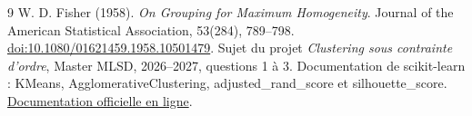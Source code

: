 \documentclass[10pt,a4paper]{article}
\begin{document}
\begingroup\small
\begin{thebibliography}{9}
\setlength{\itemsep}{2pt}
 W. D. Fisher (1958). \emph{On Grouping for Maximum Homogeneity}.
Journal of the American Statistical Association, 53(284), 789--798.
\href{https://doi.org/10.1080/01621459.1958.10501479}{doi:10.1080/01621459.1958.10501479}.
 Sujet du projet \emph{Clustering sous contrainte d'ordre},
Master MLSD, 2026--2027, questions 1 à 3.
 Documentation de scikit-learn : KMeans,
AgglomerativeClustering, adjusted\_rand\_score et silhouette\_score.
\href{https://scikit-learn.org/stable/}{Documentation officielle en ligne}.
\end{thebibliography}
\endgroup
\end{document}
